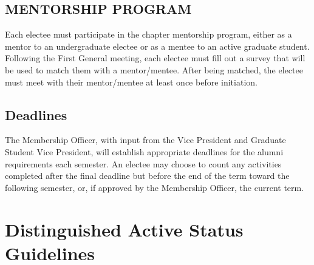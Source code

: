\section{MENTORSHIP PROGRAM} Each electee must participate in the chapter mentorship program, either as a mentor to an undergraduate electee or as a mentee to an active graduate student. Following the First General meeting, each electee must fill out a survey that will be used to match them with a mentor/mentee. After being matched, the electee must meet with their mentor/mentee at least once before initiation.

\section{Deadlines}  The Membership Officer, with input from the Vice President and Graduate Student Vice President, will establish appropriate deadlines for the alumni requirements each semester. An electee may choose to count any activities completed after the final deadline but before the end of the term toward the following semester, or, if approved by the Membership Officer, the current term.





\chapter{Distinguished Active Status Guidelines}\label{sec:DAstatus}

